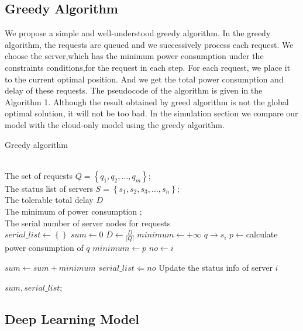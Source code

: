 \documentclass[twoside,twocolumn]{article}
\begin{document}
\subsection{Greedy Algorithm}
We propose a simple and well-understood greedy algorithm. In the greedy algorithm, the requests are queued and we successively process each request. We choose the server,which has the minimum power consumption under the constraints conditions,for the request in each step. For each request, we place it to the current optimal position. And we get the total power consumption  and delay of these requests. The pseudocode of the algorithm is given in the Algorithm 1. Although the result obtained by greed algorithm is not the global optimal solution, it will not be too bad.  In the simulation section we compare our model with the cloud-only model using the greedy algorithm. 
\begin{algorithm}[htb]   
\caption{Greedy algorithm}   
\label{alg:Framwork}   
\begin{algorithmic}[1] %
\REQUIRE ~~\\ %
The set of requests  $\mathit{Q}=\left\{q_1,q_2,\dots,q_m \right\} $;\\  
The status list of servers $S=\left\{s_1,s_2,s_3,\dots,s_n \right\}$;\\ 
The tolerable total delay $D$
\ENSURE ~~\\ %
The minimum of power consumption ;\\
The serial number of server nodes for requests \\ 
\STATE $serial\_list \leftarrow \left\{ \right\}$
\STATE $sum \leftarrow 0$
\STATE $\overline{D} \leftarrow \frac{D}{\left|Q\right|}$
\STATE $minimum \leftarrow +\infty$
\STATE $q \rightarrow s_i$
\STATE  $p \leftarrow $calculate power consumption of $q$
\STATE $minimum \leftarrow p$
\STATE $no \leftarrow i$
\ENDIF
\ENDIF 

\ENDFOR
\STATE $sum \leftarrow sum+minimum$ 
\STATE $serial\_list \Leftarrow no $
\STATE Update the status info of server $i$
\ENDFOR
  
\RETURN $sum,serial\_list$; %
\end{algorithmic}  
\end{algorithm}  

\subsection{Deep Learning Model}
\end{document}
